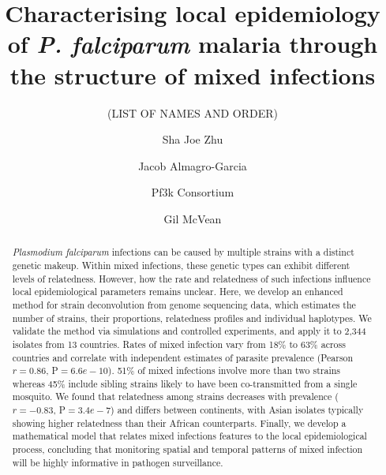 \documentclass[9pt,lineno]{elife}
\newcounter{todocounter}
\newcommand{\done}[2][]
{\todo[color=green!40, #1]{#2}}
\newcommand{\donenum}[2][]
{\stepcounter{todocounter}\done[#1]{\thetodocounter: #2}}
\begin{document}
\title{Characterising local epidemiology of {\it P. falciparum} malaria through the structure of mixed infections}
\newcommand\shorttitle{Mixed infections in malaria}
\date{}

\author[?]{(LIST OF NAMES AND ORDER)}
\author[1]{Sha Joe Zhu}
\author[1,2,3,4]{Jacob Almagro-Garcia}
\author[?]{Pf3k Consortium}
\author[1,3]{Gil McVean}



\maketitle{}

\begin{abstract}
{\it Plasmodium falciparum} infections can be caused by multiple strains with a distinct genetic makeup. Within mixed infections, these genetic types can exhibit different levels of relatedness. However, how the rate and relatedness of such infections influence local epidemiological parameters remains unclear.  Here, we develop an enhanced method for strain deconvolution from genome sequencing data, which estimates the number of strains, their proportions, relatedness profiles and individual haplotypes.  We validate the method via simulations and controlled experiments, and apply it to 2,344 isolates from 13 countries.  Rates of mixed infection vary from 18\% to 63\% across countries and correlate with independent estimates of parasite prevalence (Pearson $r = 0.86$, P$=6.6e-10$).  51\% of mixed infections involve more than two strains whereas 45\% include sibling strains likely to have been co-transmitted from a single mosquito. We found that relatedness among strains decreases with prevalence ($r = -0.83$, P$=3.4e-7$) and differs between continents, with Asian isolates typically showing higher relatedness than their African counterparts. Finally, we develop a mathematical model that relates mixed infections features to the local epidemiological process, concluding that monitoring spatial and temporal patterns of mixed infection will be highly informative in pathogen surveillance.
\end{abstract}
\end{document}
